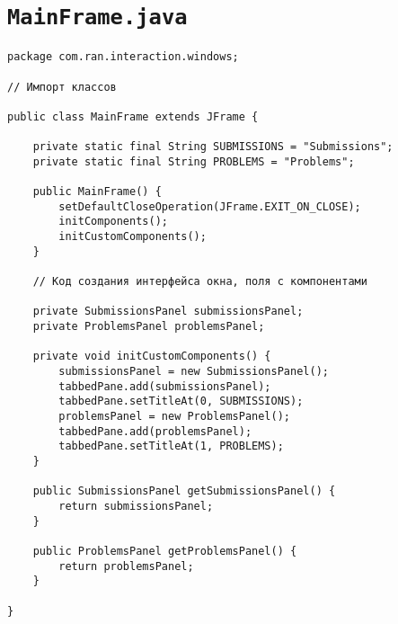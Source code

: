 \section*{\texttt{MainFrame.java}}
\begin{verbatim}
package com.ran.interaction.windows;

// Импорт классов

public class MainFrame extends JFrame {

    private static final String SUBMISSIONS = "Submissions";
    private static final String PROBLEMS = "Problems";
    
    public MainFrame() {
        setDefaultCloseOperation(JFrame.EXIT_ON_CLOSE);
        initComponents();
        initCustomComponents();
    }

    // Код создания интерфейса окна, поля с компонентами                  

    private SubmissionsPanel submissionsPanel;
    private ProblemsPanel problemsPanel;

    private void initCustomComponents() {
        submissionsPanel = new SubmissionsPanel();
        tabbedPane.add(submissionsPanel);
        tabbedPane.setTitleAt(0, SUBMISSIONS);
        problemsPanel = new ProblemsPanel();
        tabbedPane.add(problemsPanel);
        tabbedPane.setTitleAt(1, PROBLEMS);
    }
    
    public SubmissionsPanel getSubmissionsPanel() {
        return submissionsPanel;
    }

    public ProblemsPanel getProblemsPanel() {
        return problemsPanel;
    }
    
}
\end{verbatim}

